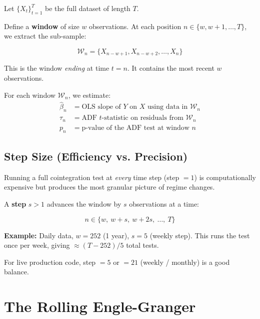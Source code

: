 \documentclass[12pt, a4paper]{article}
\begin{document}
Let $\{X_t\}_{t=1}^{T}$ be the full dataset of length $T$.

Define a \textbf{window} of size $w$ observations. At each position $n \in \{w, w+1, \ldots, T\}$, 
we extract the sub-sample:

\begin{equation}
    \mathcal{W}_n = \{X_{n-w+1}, X_{n-w+2}, \ldots, X_n\}
    \label{eq:window}
\end{equation}

This is the window \emph{ending} at time $t = n$. It contains the most recent $w$ observations.

For each window $\mathcal{W}_n$, we estimate:
\begin{align}
    \hat\beta_n &= \text{OLS slope of } Y \text{ on } X \text{ using data in } \mathcal{W}_n \label{eq:rolling_beta}\\
    \tau_n      &= \text{ADF } t\text{-statistic on residuals from } \mathcal{W}_n \label{eq:rolling_tau} \\
    p_n         &= \text{p-value of the ADF test at window } n \label{eq:rolling_p}
\end{align}

\subsection{Step Size (Efficiency vs. Precision)}

Running a full cointegration test at \emph{every} time step (step $= 1$) is computationally 
expensive but produces the most granular picture of regime changes.

A \textbf{step} $s > 1$ advances the window by $s$ observations at a time:

\begin{equation}
    n \in \{w,\ w+s,\ w+2s,\ \ldots,\ T\}
    \label{eq:step}
\end{equation}

\textbf{Example:} Daily data, $w = 252$ (1 year), $s = 5$ (weekly step). 
This runs the test once per week, giving $\approx (T - 252)/5$ total tests.

For live production code, step $= 5$ or $= 21$ (weekly / monthly) is a good balance.

\section{The Rolling Engle-Granger}
\end{document}
